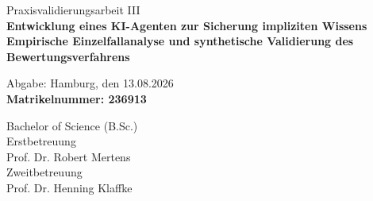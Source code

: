 \documentclass[
  10pt,
  ngerman,
  a4paper,
  toc=graduated,
  numbers=noenddot,
  headings=standardclasses,
  nonumberlist
]{scrartcl}
\begin{document}
\hypersetup{pageanchor=false}
\thispagestyle{empty}

\vspace{1cm}

\begin{figure}[htbp]
    \centering

    \begin{minipage}[t]{0.45\textwidth}
        \centering
        
    \end{minipage}
\end{figure}

\vspace{1cm}
\begin{center}
	{\Large Praxisvalidierungsarbeit III} \\
	\vspace{3cm}
	{\huge \textbf{Entwicklung eines KI-Agenten zur Sicherung impliziten Wissens}}\\
    \vspace{0.3cm}
    {\LARGE \textbf{{Empirische Einzelfallanalyse und synthetische Validierung des Bewertungsverfahrens}}}\\
    
\end{center}

\vspace{1.5cm}
\begin{center}
	Abgabe: Hamburg, den 13.08.2026\\[3\baselineskip]
	\textbf{\textcolor{ihk_blue}{Matrikelnummer: 236913}}

    Bachelor of Science (B.Sc.) \\[4\baselineskip]
	
	Erstbetreuung \\
    Prof. Dr. Robert Mertens \\[2\baselineskip]

    Zweitbetreuung \\
    Prof. Dr. Henning Klaffke \\

\end{center}


\newpage
\hypersetup{pageanchor=true}
\tableofcontents
\end{document}
